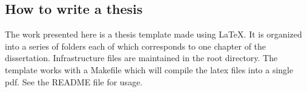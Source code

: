 \subsection{How to write a thesis}
The work presented here is a thesis template made using \LaTeX.
It is organized into a series of folders each of which corresponds to one chapter of the dissertation.
Infrastructure files are maintained in the root directory.
The template works with a Makefile which will compile the latex files into a single pdf. See the README file for usage.
